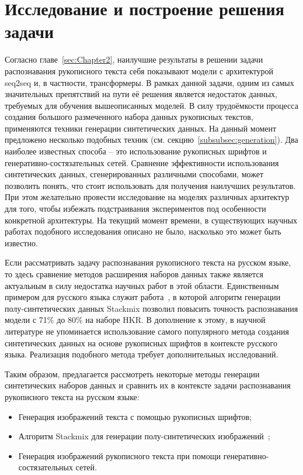 \section{Исследование и построение решения задачи}
\label{sec:Chapter3} 

Согласно главе~\ref{sec:Chapter2}, наилучшие результаты в решении задачи распознавания рукописного текста себя показывают
модели с архитектурой seq2seq и, в частности, трансформеры.
В рамках данной задачи, одним из самых значительных препятствий на пути её решения является недостаток данных,
требуемых для обучения вышеописанных моделей.
В силу трудоёмкости процесса создания большого размеченного набора данных рукописных текстов, применяются техники генерации синтетических данных.
На данный момент предложено несколько подобных техник (см. секцию~\ref{subsubsec:generation}).
Два наиболее известных способа -- это использование рукописных шрифтов и генеративно-состязательных сетей.
Сравнение эффективности использования синтетических данных, сгенерированных различными способами, может позволить понять,
что стоит использовать для получения наилучших результатов.
При этом желательно провести исследование на моделях различных архитектур для того, чтобы избежать
подстраивания экспериментов под особенности конкретной архитектуры.
На текущий момент времени, в существующих научных работах подобного исследования описано не было, насколько это может быть известно.

Если рассматривать задачу распознавания рукописного текста на русском языке,
то здесь сравнение методов расширения наборов данных также является актуальным в силу недостатка научных работ в этой области.
Единственным примером для русского языка служит работа~\cite{shonenkov2021stackmix},
в которой алгоритм генерации полу-синтетических данных Stackmix позволил повысить точность распознавания модели с 71\% до 80\% на наборе HKR.
В дополнение к этому, в научной литературе не упоминается использование самого популярного метода создания синтетических данных
на основе рукописных шрифтов в контексте русского языка.
Реализация подобного метода требует дополнительных исследований.

Таким образом, предлагается рассмотреть некоторые методы генерации синтетических наборов данных и сравнить их в контексте
задачи распознавания рукописного текста на русском языке:
\begin{itemize}
    \item Генерация изображений текста с помощью рукописных шрифтов;
    \item Алгоритм Stackmix для генерации полу-синтетических изображений~\cite{shonenkov2021stackmix};
    \item Генерация изображений рукописного текста при помощи генеративно-состязательных сетей.
\end{itemize}

